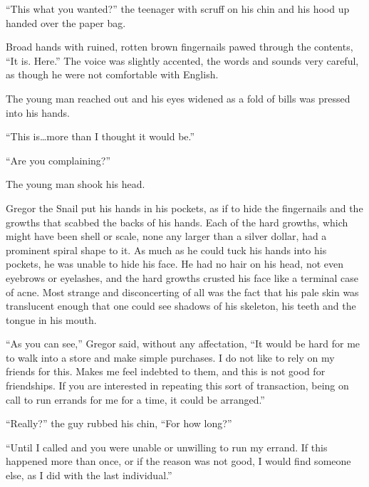 





``This what you wanted?'' the teenager with scruff on his chin and his hood up handed over the paper bag.



Broad hands with ruined, rotten brown fingernails pawed through the contents, ``It is.  Here.''  The voice was slightly accented, the words and sounds very careful, as though he were not comfortable with English.



The young man reached out and his eyes widened as a fold of bills was pressed into his hands.



``This is\ldots more than I thought it would be.''



``Are you complaining?''



The young man shook his head.



Gregor the Snail put his hands in his pockets, as if to hide the fingernails and the growths that scabbed the backs of his hands.  Each of the hard growths, which might have been shell or scale, none any larger than a silver dollar, had a prominent spiral shape to it.  As much as he could tuck his hands into his pockets, he was unable to hide his face.  He had no hair on his head, not even eyebrows or eyelashes, and the hard growths crusted his face like a terminal case of acne.  Most strange and disconcerting of all was the fact that his pale skin was translucent enough that one could see shadows of his skeleton, his teeth and the tongue in his mouth.



``As you can see,'' Gregor said, without any affectation, ``It would be hard for me to walk into a store and make simple purchases.  I do not like to rely on my friends for this.  Makes me feel indebted to them, and this is not good for friendships.  If you are interested in repeating this sort of transaction, being on call to run errands for me for a time, it could be arranged.''



``Really?'' the guy rubbed his chin, ``For how long?''



``Until I called and you were unable or unwilling to run my errand.  If this happened more than once, or if the reason was not good, I would find someone else, as I did with the last individual.''



